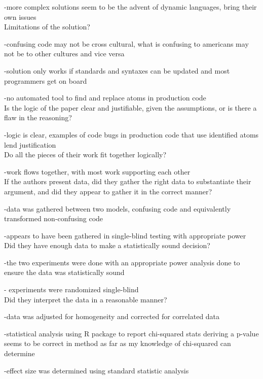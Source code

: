 \documentclass{IEEEtran}
\begin{document}
-more complex solutions seem to be the advent of dynamic languages, bring their own issues
\\

Limitations of the solution?

-confusing code may not be cross cultural, what is confusing to americans may not be to other cultures and vice versa

-solution only works if standards and syntaxes can be updated and most programmers get on board

-no automated tool to find and replace atoms in production code
\\

Is the logic of the paper clear and justiﬁable, given the assumptions, or is there a ﬂaw in the reasoning?

-logic is clear, examples of code bugs in production code that use identified atoms lend justification
\\

Do all the pieces of their work ﬁt together logically?

-work flows together, with most work supporting each other
\\

If the authors present data, did they gather the right data to substantiate their argument, and did they appear to 
gather it in the correct manner?

-data was gathered between two models, confusing code and equivalently transformed non-confusing code

-appears to have been gathered in single-blind testing with appropriate power
\\

Did they have enough data to make a statistically sound decision?

-the two experiments were done with an appropriate power analysis done to ensure the data was statistically sound

- experiments were randomized single-blind  
\\

Did they interpret the data in a reasonable manner?

-data was adjusted for homogeneity and corrected for correlated data

-statistical analysis using R package to report chi-squared stats deriving a p-value seems to be correct in method as 
far as my knowledge of chi-squared can determine

-effect size was determined using standard statistic analysis
\\
\end{document}
